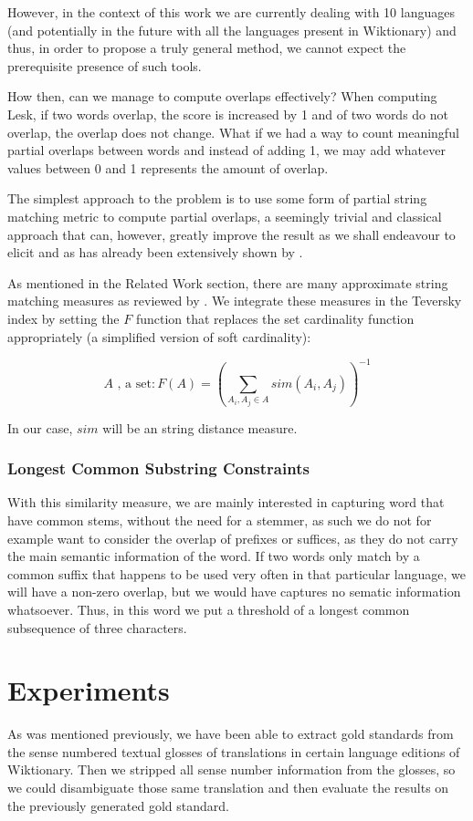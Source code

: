 \documentclass[10pt,a4paper,twoside]{article}
\begin{document}
However, in the context of this work we are currently dealing with 10 languages (and potentially in the future with all the languages present in Wiktionary) and thus, in order to propose a truly general method, we cannot expect the prerequisite presence of such tools. 

How then, can we manage to compute overlaps effectively? When computing Lesk, if two words overlap, the score is increased by 1 and of two words do not overlap, the overlap does not change. What if we had a way to count meaningful partial overlaps between words and instead of adding 1, we may add whatever values between 0 and 1 represents the amount of overlap.

The simplest approach to the problem is to use some form of partial string matching metric to compute partial overlaps, a seemingly trivial and classical approach that can, however, greatly improve the result as we shall endeavour to elicit and as has already been extensively shown by \cite{Jimenez2012}. 

As mentioned in the Related Work section, there are many approximate string matching measures as reviewed by \cite{Cohen2003}. We integrate these measures in the Teversky index by setting the \(F\) function that replaces the set cardinality function appropriately (a simplified version of soft cardinality):

\[
	A \mbox{ , a set} : F(A) = (\sum_{A_i,A_j \in A}sim(A_i, A_j))^{-1}
\]

In our case, \(sim\) will be an string distance measure.

\subsubsection{Longest Common Substring Constraints}
With this similarity measure, we are mainly interested in capturing word that have common stems, without the need for a stemmer, as such we do not for example want to consider the overlap of prefixes or suffices, as they do not carry the main semantic information of the word. If two words only match by a common suffix that happens to be used very often in that particular language, we will have a non-zero overlap, but we would have captures no sematic information whatsoever. Thus, in this word we put a threshold of a longest common subsequence of three characters.

\section{Experiments}
\label{sec:expe}
As was mentioned previously, we have been able to extract gold standards from the sense numbered textual glosses of translations in certain language editions of Wiktionary. Then we stripped all sense number information from the glosses, so we could disambiguate those same translation and then evaluate the results on the previously generated gold standard.
\end{document}
